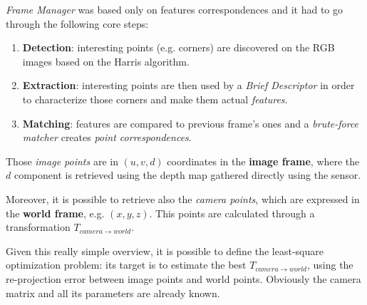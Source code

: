 \documentclass[a4paper]{article}
\begin{document}
	\textit{Frame Manager} was based only on features correspondences and it had to go through the following core steps:
	\begin{enumerate}
		\item \textbf{Detection}: interesting points (e.g. corners) are discovered on the RGB images based on the Harris algorithm.
		\item \textbf{Extraction}: interesting points are then used by a \textit{Brief Descriptor} in order to characterize those corners and make them actual \textit{features}.
		\item \textbf{Matching}: features are compared to previous frame's ones and a \textit{brute-force matcher} creates \textit{point correspondences}.
	\end{enumerate}
	Those \textit{image points} are in $(u,v,d)$ coordinates in the \textbf{image frame}, where the $d$ component is retrieved using the depth map gathered directly using  the sensor.
	
	Moreover, it is possible to retrieve also the \textit{camera points}, which are expressed in the \textbf{world frame}, e.g. $(x,y,z)$. This points are calculated through a transformation	$T_{camera \rightarrow world}$. 
	
	Given this really simple overview, it is possible to define the least-square optimization problem: its target is to estimate the best $T_{camera \rightarrow world}$, using the re-projection error between image points and world points. Obviously the camera matrix and all its parameters are already known.
	
\end{document}
